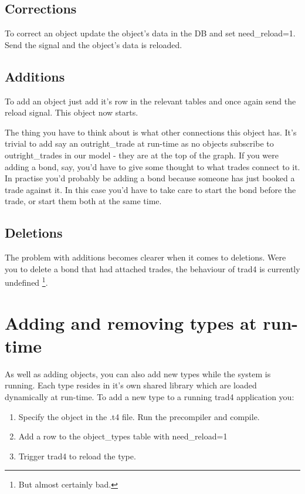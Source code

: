 \documentclass{report}
\begin{document}
\subsection{Corrections}

To correct an object update the object's data in the DB and set need_reload=1. Send the signal and the object's data is reloaded.

\subsection{Additions}

To add an object just add it's row in the relevant tables and once again send the reload signal. This object now starts. 

The thing you have to think about is what other connections this object has. It's trivial to add say an outright_trade at run-time as no objects subscribe to outright_trades in our model - they are at the top of the graph. If you were adding a bond, say, you'd have to give some thought to what trades connect to it.  In practise you'd probably be adding a bond because someone has just booked a trade against it. In this case you'd have to take care to start the bond before the trade, or start them both at the same time.

\subsection{Deletions}

The problem with additions becomes clearer when it comes to deletions. Were you to delete a bond that had attached trades, the behaviour of trad4 is currently undefined \footnote{But almost certainly bad.}.

\section{Adding and removing types at run-time}

As well as adding objects, you can also add new types while the system is running. Each type resides in it's own shared library which are loaded dynamically at run-time. To add a new type to a running trad4 application you:

\begin{enumerate}
\item Specify the object in the .t4 file. Run the precompiler and compile.
\item Add a row to the object_types table with need_reload=1
\item Trigger trad4 to reload the type.
\end{enumerate}
\end{document}
